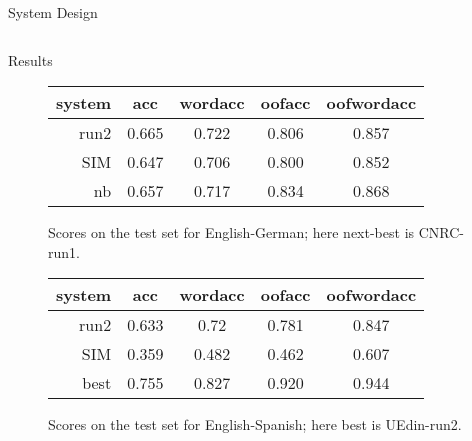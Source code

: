 \documentclass[final,t]{beamer}
\begin{document}
\begin{frame}{}
\begin{columns}[t]
\begin{column}{.64\linewidth}
\begin{columns}
\begin{column}{.48\linewidth}
\begin{block}{System Design}
\begin{center}
\end{center}

\end{block}

    \end{column}
  \end{columns}
  \end{column}
  \end{columns}

\begin{columns}
  \begin{column}{.64\linewidth}

\begin{block}{Results}

\begin{figure}[t]
  \begin{center}
  \begin{tabular}{|r|c|c|c|c|}
    \hline
    system & acc      & wordacc  & oofacc & oofwordacc \\
    \hline
    run2  &  0.665 & 0.722  &  0.806  & 0.857 \\
    SIM    &  0.647 & 0.706 & 0.800 & 0.852 \\
    nb     &  0.657   & 0.717   & 0.834 & 0.868    \\
    \hline
  \end{tabular}
  \end{center}
\caption{Scores on the test set for English-German; here next-best is CNRC-run1.}
\label{fig:theresults-en-de}
\end{figure}

\begin{figure}[t]
  \begin{center}
  \begin{tabular}{|r|c|c|c|c|}
    \hline
    system & acc      & wordacc  & oofacc & oofwordacc \\
    \hline
    run2  &  0.633 & 0.72 & 0.781 & 0.847 \\
    SIM    &  0.359 &  0.482 & 0.462 & 0.607 \\
    best   &  0.755 & 0.827   & 0.920  & 0.944 \\
    \hline
  \end{tabular}
  \end{center}
\caption{Scores on the test set for English-Spanish; here best is UEdin-run2.}
\label{fig:theresults-en-es}
\end{figure}


\end{block}
\end{column}
\end{columns}
\end{frame}
\end{document}
